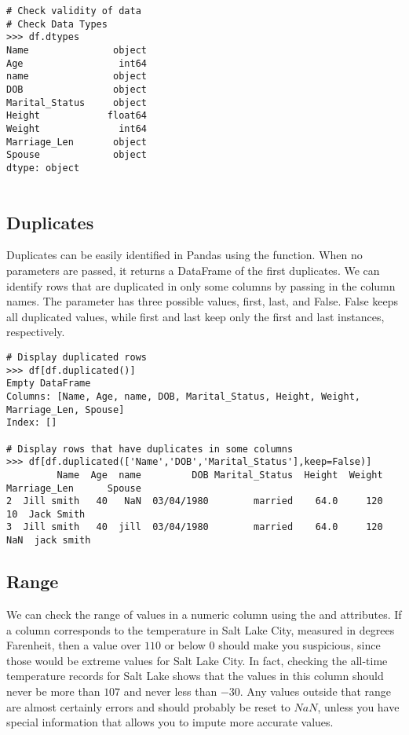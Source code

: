 \begin{lstlisting}
# Check validity of data
# Check Data Types
>>> df.dtypes
Name               object
Age                 int64
name               object
DOB                object
Marital_Status     object
Height            float64
Weight              int64
Marriage_Len       object
Spouse             object
dtype: object


\end{lstlisting}


\subsection*{Duplicates} 
Duplicates can be easily identified in Pandas using the  function.
When no parameters are passed, it returns a DataFrame of the first duplicates.
We can identify rows that are duplicated in only some columns by passing in the column names.
The  parameter has three possible values, first, last, and False.
False keeps all duplicated values, while first and last keep only the first and last instances, respectively.

\begin{lstlisting}
# Display duplicated rows
>>> df[df.duplicated()]
Empty DataFrame
Columns: [Name, Age, name, DOB, Marital_Status, Height, Weight, Marriage_Len, Spouse]
Index: []

# Display rows that have duplicates in some columns
>>> df[df.duplicated(['Name','DOB','Marital_Status'],keep=False)]
         Name  Age  name         DOB Marital_Status  Height  Weight Marriage_Len      Spouse
2  Jill smith   40   NaN  03/04/1980        married    64.0     120           10  Jack Smith
3  Jill smith   40  jill  03/04/1980        married    64.0     120          NaN  jack smith
\end{lstlisting}

\subsection*{Range}
We can check the range of values in a numeric column using the  and  attributes.
If a column corresponds to the temperature in Salt Lake City, measured in degrees Farenheit, then a value over $110$ or below $0$ should make you suspicious, since those would be extreme values for Salt Lake City.  
In fact, checking the all-time temperature records for Salt Lake shows that the values in this column should never be more than $107$ and never less than $-30$. 
Any values outside that range are almost certainly errors and should probably be reset to $NaN$, unless you have special information that allows you to impute more accurate values.

